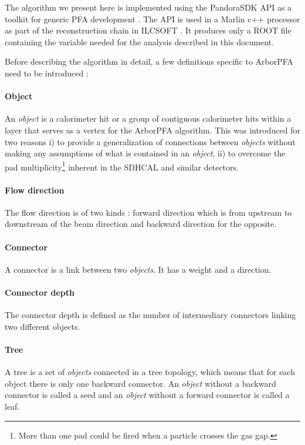 \documentclass[cits]{JINST}
\begin{document}
The algorithm we present here is implemented using the PandoraSDK API as a toolkit for generic PFA development \cite{pandora-sdk}. The API is used in a Marlin \cite{marlin-lccd} c++ processor as part of the reconstruction chain in ILCSOFT \cite{ilcsoft}. It produces only a ROOT \cite{root} file containing the variable needed for the analysis described in this document.

Before describing the algorithm in detail, a few definitions specific to ArborPFA need to be introduced :

\paragraph*{Object} An \textit{object} is a calorimeter hit or a group of contiguous calorimeter hits within a layer that serves as a vertex for the ArborPFA algorithm. This was introduced for two reasons i) to provide a generalization of connections between \textit{objects} without making any assumptions of what is contained in an \textit{object}, ii) to overcome the pad multiplicity\footnote{More than one pad could be fired when a particle crosses the gas gap.} inherent in the SDHCAL \cite{sdhcal-paper} and similar detectors.

\paragraph*{Flow direction} The flow direction is of two kinds : forward direction which is from upstream to downstream of the beam direction and backward direction for the opposite.

\paragraph*{Connector} A connector is a link between two \textit{objects}. It has a weight and a direction.

\paragraph*{Connector depth} The connector depth is defined as the number of intermediary connectors linking two different objects.

\paragraph*{Tree} A tree is a set of \textit{objects} connected in a tree topology, which means that for each object there is only one backward connector. An \textit{object} without a backward connector is called a seed and an \textit{object} without a forward connector is called a leaf.
\end{document}
